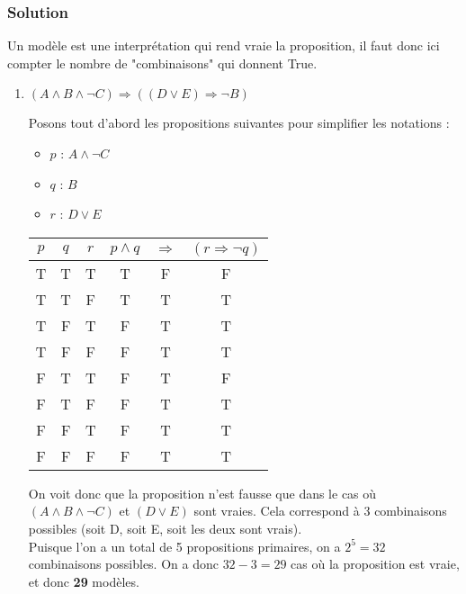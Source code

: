 \subsubsection*{Solution}


    Un modèle est une interprétation qui rend vraie la proposition, il faut donc ici compter le nombre de "combinaisons" qui donnent True.
    
\begin{enumerate}
	\item $(A \land B \land \neg C) \Rightarrow ((D \lor E) \Rightarrow \neg B)$
    
    Posons tout d'abord les propositions suivantes pour simplifier les notations :
    \begin{itemize}
        \item $p$ : $A \land \neg C$
        \item $q$ : $B$
        \item $r$ : $D \lor E$
    \end{itemize}
    
    \begin{center}
    	\begin{tabular}{ccc|ccc}
    		$p$ & $q$ & $r$ & $p \land q$ & $\Rightarrow$ & $(r \Rightarrow \neg q)$\\
    		\hline
    		T & T & T & T & \color{red}F & F \\
    		T & T & F & T & \color{red}T & T \\
    		T & F & T & F & \color{red}T & T \\
    		T & F & F & F & \color{red}T & T \\
    		F & T & T & F & \color{red}T & F \\
    		F & T & F & F & \color{red}T & T \\
    		F & F & T & F & \color{red}T & T \\
    		F & F & F & F & \color{red}T & T \\
    	\end{tabular}
    \end{center}
    
    On voit donc que la proposition n'est fausse que dans le cas où $(A \land B \land \neg C)$ et $(D \lor E)$ sont vraies.
    Cela correspond à 3 combinaisons possibles (soit D, soit E, soit les deux sont vrais).\\
    Puisque l'on a un total de 5 propositions primaires, on a $2^5 = 32$ combinaisons possibles.
    On a donc $32-3 = 29$ cas où la proposition est vraie, et donc \textbf{29} modèles.\\
    

\end{enumerate}
